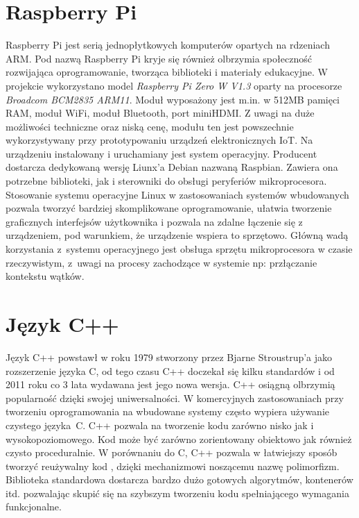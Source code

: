 \documentclass[12pt, eng, twoside, openany, final]{mgr}
\begin{document}
    \section{Raspberry Pi}
    Raspberry Pi jest serią jednopłytkowych komputerów opartych na rdzeniach ARM. Pod nazwą Raspberry Pi kryje się również olbrzymia społeczność rozwijająca oprogramowanie, tworząca biblioteki i materiały edukacyjne.
    W projekcie wykorzystano model \emph{Raspberry Pi Zero W V1.3} oparty na procesorze  \emph{Broadcom BCM2835 ARM11}\cite{RpiData}. Moduł wyposażony jest m.in. w 512MB pamięci RAM, moduł WiFi, moduł Bluetooth, port miniHDMI. Z uwagi na  duże możliwości techniczne oraz niską cenę, modułu ten jest powszechnie wykorzystywany przy prototypowaniu urządzeń elektronicznych IoT. 
    Na urządzeniu instalowany i uruchamiany jest system operacyjny. Producent dostarcza dedykowaną wersję Liunx'a Debian nazwaną Raspbian. Zawiera ona potrzebne biblioteki, jak i sterowniki do obsługi peryferiów mikroprocesora. Stosowanie systemu operacyjne Linux w zastosowaniach systemów wbudowanych pozwala tworzyć bardziej skomplikowane oprogramowanie, ułatwia tworzenie graficznych interfejsów użytkownika i pozwala na zdalne łączenie się z urządzeniem, pod warunkiem, że urządzenie wspiera to sprzętowo. Główną wadą korzystania z~systemu operacyjnego jest obsługa sprzętu mikroprocesora w czasie rzeczywistym, z~uwagi na procesy zachodzące w systemie np: przłączanie kontekstu wątków. 
    \section{Język C++}
    Język C++ powstawł w roku 1979 stworzony przez Bjarne Stroustrup'a jako rozszerzenie języka C, od tego czasu C++ doczekał się kilku standardów i od 2011 roku co 3 lata wydawana jest jego nowa wersja. C++ osiągną olbrzymią popularność dzięki swojej uniwersalności. W komercyjnych zastosowaniach przy tworzeniu oprogramowania na wbudowane systemy  często wypiera używanie czystego języka~C. C++ pozwala na tworzenie kodu zarówno nisko jak i wysokopoziomowego. Kod może być zarówno zorientowany obiektowo jak również czysto proceduralnie. W porównaniu do C, C++ pozwala w łatwiejszy sposób tworzyć reużywalny kod \cite{EffectiveModern}, dzięki mechanizmowi noszącemu nazwę polimorfizm. Biblioteka standardowa dostarcza bardzo dużo gotowych algorytmów, kontenerów itd. pozwalając skupić się na szybszym tworzeniu kodu spełniającego wymagania funkcjonalne.

    \newpage
\end{document}
